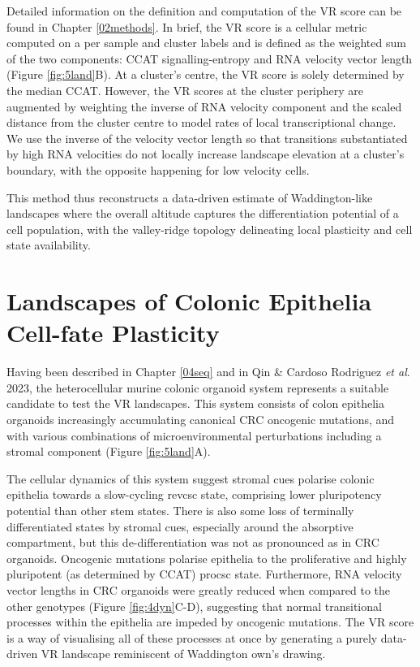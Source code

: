 Detailed information on the definition and computation of the VR score can be found in Chapter \ref{02methods}. In brief, the VR score is a cellular metric computed on a per sample and cluster labels and is defined as the weighted sum of the two components: CCAT signalling-entropy \cite{teschendorff_single-cell_2017} and RNA velocity vector length \cite{bergen_generalizing_2020} (Figure \ref{fig:5land}B). 
At a cluster's centre, the VR score is solely determined by the median CCAT. However, the VR scores at the cluster periphery are augmented by weighting the inverse of RNA velocity component and the scaled distance from the cluster centre to model rates of local transcriptional change. We use the inverse of the velocity vector length so that transitions substantiated by high RNA velocities do not locally increase landscape elevation at a cluster's boundary, with the opposite happening for low velocity cells.

This method thus reconstructs a data-driven estimate of Waddington-like landscapes where the overall altitude captures the differentiation potential of a cell population, with the valley-ridge topology delineating local plasticity and cell state availability. 

\section{Landscapes of Colonic Epithelia Cell-fate Plasticity}

Having been described in Chapter \ref{04seq} and in Qin \& Cardoso Rodriguez \textit{et al}. 2023, the heterocellular murine colonic organoid system represents a suitable candidate to test the VR landscapes. 
This system consists of colon epithelia organoids increasingly accumulating canonical CRC oncogenic mutations, and with various combinations of microenvironmental perturbations including a stromal component (Figure \ref{fig:5land}A).

The cellular dynamics of this system suggest stromal cues polarise colonic epithelia towards a slow-cycling \acrshort{revcsc} state, comprising lower pluripotency potential than other stem states. There is also some loss of terminally differentiated states by stromal cues, especially around the absorptive compartment, but this de-differentiation was not as pronounced as in CRC organoids.
Oncogenic mutations polarise epithelia to the proliferative and highly pluripotent (as determined by CCAT) \acrshort{procsc} state. Furthermore, RNA velocity vector lengths in CRC organoids were greatly reduced when compared to the other genotypes (Figure \ref{fig:4dyn}C-D), suggesting that normal transitional processes within the epithelia are impeded by oncogenic mutations.
The VR score is a way of visualising all of these processes at once by generating a purely data-driven VR landscape reminiscent of Waddington own's drawing.

